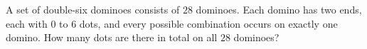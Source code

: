 A set of double-six dominoes consists of $28$ dominoes. Each domino has two ends, each with $0$ to $6$ dots, and every possible combination occurs on exactly one domino. How many dots are there in total on all $28$ dominoes?
